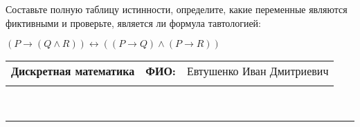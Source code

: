 \documentclass[10pt]{exam}
\newcommand{\class}{Дискретная математика}
\newcommand{\examdate}{}
\begin{document}
\begin{questions}
\begin{enumerate}[a)]
\end{enumerate}\question Составьте полную таблицу истинности, определите, какие переменные являются фиктивными и проверьте, является ли формула тавтологией:

$(P \rightarrow (Q \land R)) \leftrightarrow ((P \rightarrow Q) \land (P \rightarrow R))$

\end{questions}
\newpage
\begin{flushright}
\begin{tabular}{p{2.8in} r l}
\textbf{\class} & \textbf{ФИО:} &Евтушенко Иван Дмитриевич
\\

\textbf{\examdate} &&\\
\end{tabular}\\
\end{flushright}
\rule[1ex]{\textwidth}{.1pt}
\end{document}
